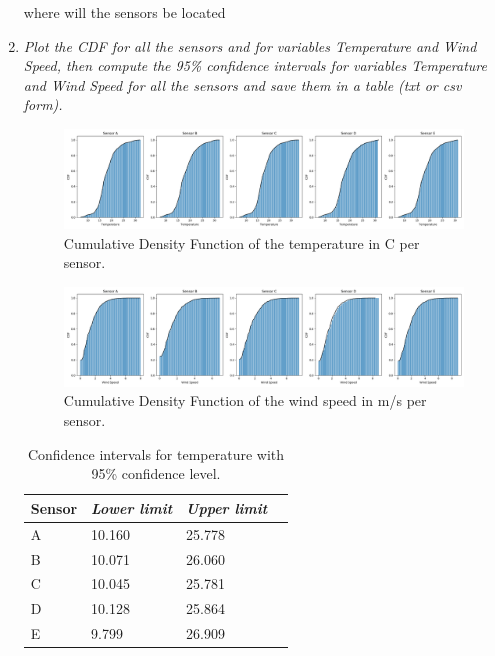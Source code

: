 \documentclass[a4paper,12pt]{article} %
\begin{document}
\begin{enumerate}
where will the sensors be located

\item {\it Plot the CDF for all the sensors and for variables Temperature and Wind Speed, then compute the 95\% confidence intervals for variables Temperature and Wind Speed for all the sensors and save them in a table (txt or csv form).}

\begin{figure}[H] 
	\centering
	\includegraphics[width=1\textwidth]{CDF of temperature per sensor.png} 
	\caption{Cumulative Density Function of the temperature in \degree C per sensor.} %
	\label{fig:CDF_T}
\end{figure}  

\begin{figure}[H] 
	\centering
	\includegraphics[width=1\textwidth]{CDF of wind speed per sensor.png} 
	\caption{Cumulative Density Function of the wind speed in m/s per sensor.} %
	\label{fig:CDF_W}
\end{figure} 



\begin{table}[H]
	\centering
	\caption{Confidence intervals for temperature  with 95\% confidence level.}
	\begin{tabular}{llll}
		\multicolumn{1}{c}{\textbf{Sensor}}  & \multicolumn{1}{c}{\textit{Lower limit}} & \textit{Upper limit} \\ \hline
		 A      & 10.160 & 25.778  \\
		B      & 10.071 & 26.060 \\
		C      & 10.045 & 25.781 \\
		D      & 10.128 & 25.864 \\
		E      & 9.799  & 26.909 
	\end{tabular}
\label{CI_T}
\end{table}


\end{enumerate}
\end{document}
